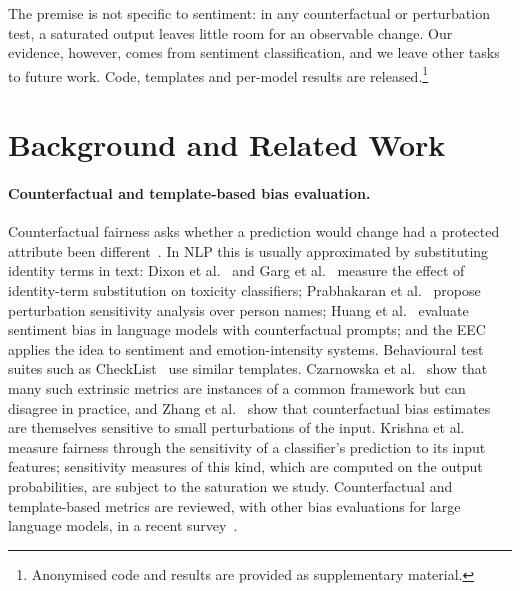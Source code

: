 \documentclass[runningheads]{llncs}
\begin{document}
The premise is not specific to sentiment: in any counterfactual or perturbation
test, a saturated output leaves little room for an observable change. Our evidence,
however, comes from sentiment classification, and we leave other tasks to
future work. Code, templates and per-model results are
released.\footnote{Anonymised code and results are provided as supplementary
material.}

\section{Background and Related Work}
\paragraph{Counterfactual and template-based bias evaluation.}
Counterfactual fairness asks whether a prediction would change had a protected
attribute been different~\cite{kusner2017}. In NLP this is usually approximated
by substituting identity terms in text: Dixon et al.~\cite{dixon2018} and Garg
et al.~\cite{garg2019} measure the effect of identity-term substitution on
toxicity classifiers; Prabhakaran et al.~\cite{prabhakaran2019} propose
perturbation sensitivity analysis over person names; Huang et
al.~\cite{huang2020} evaluate sentiment bias in language models with
counterfactual prompts; and the EEC~\cite{kiritchenko2018} applies the idea to
sentiment and emotion-intensity systems. Behavioural test suites such as
CheckList~\cite{ribeiro2020} use similar templates. Czarnowska et
al.~\cite{czarnowska2021} show that many such extrinsic metrics are instances
of a common framework but can disagree in practice, and Zhang et
al.~\cite{zhang2021} show that counterfactual bias estimates are themselves
sensitive to small perturbations of the input. Krishna et
al.~\cite{krishna2022} measure fairness through the sensitivity of a
classifier's prediction to its input features; sensitivity measures of this
kind, which are computed on the output probabilities, are subject to the
saturation we study. Counterfactual and template-based
metrics are reviewed, with other bias evaluations for large language models,
in a recent survey~\cite{gallegos2024}.
\end{document}
